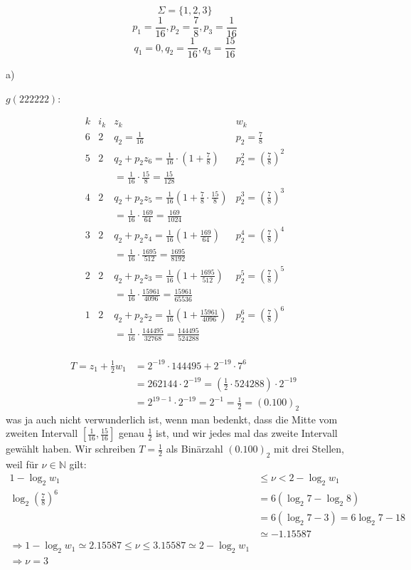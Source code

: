 \[ \Sigma = \{1,2,3\} \]
\[
p_{1} = \frac{1}{16}, p_{2} = \frac{7}{8}, p_{3} = \frac{1}{16}
\]
\[
q_{1} = 0, q_{2} = \frac{1}{16}, q_{3} = \frac{15}{16}
\]

a)

$g(222222)$:

\[
\begin{array}{c|c|l|l}
k & i_{k} & z_{k} & w_{k} \\
\hline
6 & 2 & q_{2} = \frac{1}{16} & p_{2} = \frac{7}{8} \\
5 & 2 & q_{2} + p_{2}z_{6} = \frac{1}{16}\cdot(1 + \frac{7}{8}) & p_{2}^{2} = \left(\frac{7}{8}\right)^{2} \\
& & = \frac{1}{16}\cdot\frac{15}{8} = \frac{15}{128} & \\
4 & 2 & q_{2} + p_{2}z_{5} = \frac{1}{16}(1 + \frac{7}{8}\cdot\frac{15}{8} ) & p_{2}^{3} = \left(\frac{7}{8}\right)^{3} \\
& & = \frac{1}{16}\cdot\frac{169}{64} = \frac{169}{1024} & \\
3 & 2 & q_{2} + p_{2}z_{4} = \frac{1}{16}(1 + \frac{169}{64} ) & p_{2}^{4} = \left(\frac{7}{8}\right)^{4} \\
& & = \frac{1}{16}\cdot\frac{1695}{512} = \frac{1695}{8192} & \\
2 & 2 & q_{2} + p_{2}z_{3} = \frac{1}{16}(1 + \frac{1695}{512} ) & p_{2}^{5} = \left(\frac{7}{8}\right)^{5} \\
& & = \frac{1}{16}\cdot\frac{15961}{4096} = \frac{15961}{65536} & \\
1 & 2 & q_{2} + p_{2}z_{2} = \frac{1}{16}(1 + \frac{15961}{4096} ) & p_{2}^{6} = \left(\frac{7}{8}\right)^{6} \\
& & = \frac{1}{16}\cdot\frac{144495}{32768} = \frac{144495}{524288} & \\
\end{array}
\]

\begin{align*}
T = z_{1} + \frac{1}{2} w_{1} &= 2^{-19}\cdot 144495 + 2^{-19}\cdot7^{6} \\
&= 262144\cdot2^{-19} = (\frac{1}{2}\cdot 524288)\cdot2^{-19} \\
&= 2^{19-1}\cdot2^{-19} = 2^{-1} = \frac{1}{2} = (0.100)_{2}
\end{align*}
was ja auch nicht verwunderlich ist, wenn man bedenkt, dass die Mitte vom zweiten Intervall $[\frac{1}{16}, \frac{15}{16}]$ genau $\frac{1}{2}$ ist,
und wir jedes mal das zweite Intervall gewählt haben. Wir schreiben $T = \frac{1}{2}$ als Binärzahl $(0.100)_{2}$ mit drei Stellen, weil für
$\nu \in \mathbb{N}$ gilt:
\begin{align*}
1 - \log_{2} w_{1} &\leq \nu < 2 - \log_{2} w_{1} \\
\log_{2} \left(\frac{7}{8}\right)^{6} &= 6(\log_{2}7 - \log_{2}8) \\
&= 6(\log_{2} 7 - 3) = 6\log_{2}7 - 18 \\
&\simeq -1.15587 \\
\Rightarrow 1 - \log_{2} w_{1} \simeq 2.15587 \leq \nu \leq 3.15587 \simeq 2 - \log_{2} w_{1} \\
\Rightarrow \nu = 3
\end{align*}

